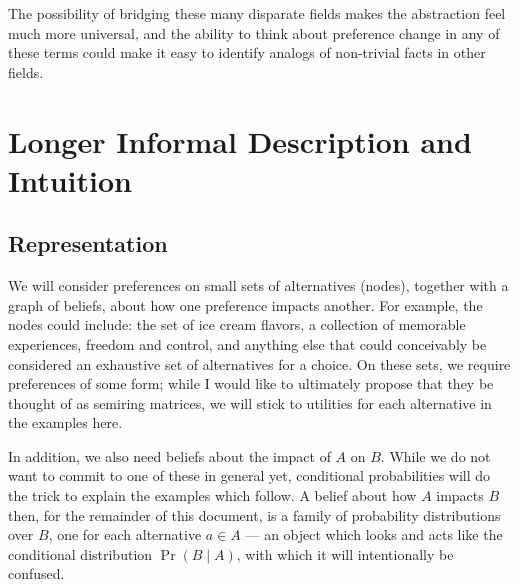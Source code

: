 \documentclass{article}
\begin{document}
	The possibility of bridging these many disparate fields makes the abstraction feel much more universal, and the ability to think about preference change in any of these terms could make it easy to identify analogs of non-trivial facts in other fields.
	
	
	

	\section{Longer Informal Description and Intuition}
	
	\subsection{Representation}
	We will consider preferences on small sets of alternatives (nodes), together with a graph of beliefs, about how one preference impacts another. For example, the nodes could include: the set of ice cream flavors, a collection of memorable experiences, freedom and control, and anything else that could conceivably be considered an exhaustive set of alternatives for a choice. On these sets, we require preferences of some form; while I would like to ultimately propose that they be thought of as semiring matrices, we will stick to utilities for each alternative in the examples here.
	
	In addition, we also need beliefs about the impact of $A$ on $B$. While we do not want to commit to one of these in general yet, conditional probabilities will do the trick to explain the examples which follow. A belief about how $A$ impacts $B$ then, for the remainder of this document, is a family of probability distributions over $B$, one for each alternative $a \in A$ --- an object which looks and acts like the conditional distribution $\Pr(B \mid A)$, with which it will intentionally be confused.
	
\end{document}
